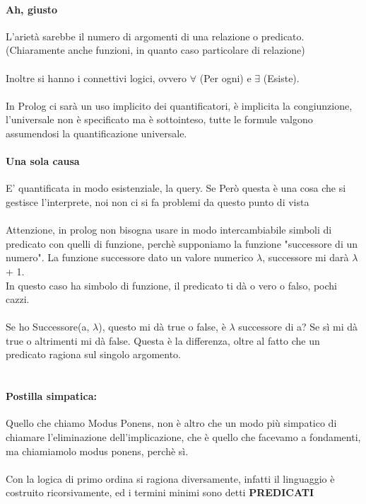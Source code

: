 \documentclass[12pt, a4paper, openany, oneside]{book}
\begin{document}
{\paragraph{Ah, giusto} L'arietà sarebbe il numero di argomenti di una relazione o
predicato. (Chiaramente anche funzioni, in quanto caso particolare di relazione)
\\ \\
Inoltre si hanno i connettivi logici, ovvero $\forall$ (Per ogni) e $\exists$ 
(Esiste). \\ \\
In Prolog ci sarà un uso implicito dei quantificatori, è implicita la 
congiunzione, l'universale non è specificato ma è sottointeso, tutte le formule 
valgono assumendosi la quantificazione universale. 
\paragraph{Una sola causa} E' quantificata in modo esistenziale, la query. Se 
Però questa è una cosa che si gestisce l'interprete, noi non ci si fa problemi 
da questo punto di vista
\\ \\
Attenzione, in prolog non bisogna usare in modo intercambiabile simboli di 
predicato con quelli di funzione, perchè supponiamo la funzione "successore di 
un numero". La funzione successore dato un valore numerico $\lambda$, successore
mi darà $\lambda$ + 1.
\\ 
In questo caso ha simbolo di funzione, il predicato ti dà o vero o falso, pochi 
cazzi.
\\ \\
Se ho Successore(a, $\lambda$), questo mi dà true o false, è $\lambda$ successore
di a? Se sì mi dà true o altrimenti mi dà false. Questa è la differenza, oltre al
fatto che un predicato ragiona sul singolo argomento.
\\ \\
\paragraph{Postilla simpatica: }Quello che chiamo Modus Ponens, non è altro che 
un modo più simpatico di chiamare l'eliminazione dell'implicazione, che è quello
che facevamo a fondamenti, ma chiamiamolo modus ponens, perchè sì. 
\\ \\
Con la logica di primo ordina si ragiona diversamente, infatti il linguaggio
è costruito ricorsivamente, ed i termini minimi sono detti \textbf{PREDICATI}
}
\end{document}
